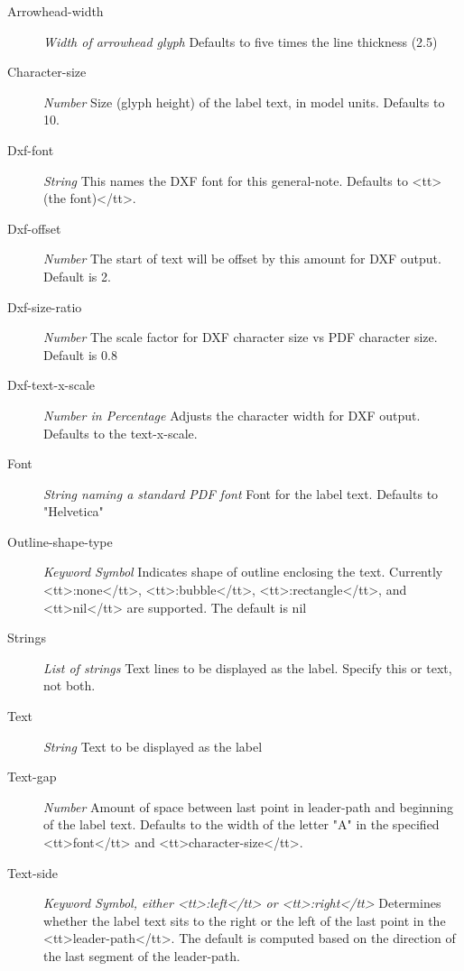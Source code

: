 \documentclass [11pt]{book}
\begin{document}
\begin{itemize}
\begin{description}
\item [Arrowhead-width]
\emph{Width of arrowhead glyph} Defaults to five times the line thickness (2.5)


\item [Character-size]
\emph{Number} Size (glyph height) of the label text, in model units. Defaults to 10.


\item [Dxf-font]
\emph{String} This names the DXF font for this general-note. Defaults to <tt>(the font)</tt>.


\item [Dxf-offset]
\emph{Number} The start of text will be offset by this amount for DXF output. Default is 2.


\item [Dxf-size-ratio]
\emph{Number} The scale factor for DXF character size vs PDF character size. Default is 0.8


\item [Dxf-text-x-scale]
\emph{Number in Percentage} Adjusts the character width for DXF output. Defaults to the text-x-scale.


\item [Font]
\emph{String naming a standard PDF font} Font for the label text. Defaults to "Helvetica"


\item [Outline-shape-type]
\emph{Keyword Symbol} Indicates shape of outline enclosing the text. Currently <tt>:none</tt>, <tt>:bubble</tt>, <tt>:rectangle</tt>,
and <tt>nil</tt> are supported. The default is nil


\item [Strings]
\emph{List of strings} Text lines to be displayed as the label. Specify this or text, not both.


\item [Text]
\emph{String} Text to be displayed as the label


\item [Text-gap]
\emph{Number} Amount of space between last point in leader-path and beginning of the label text. Defaults to the
width of the letter "A" in the specified <tt>font</tt> and <tt>character-size</tt>.


\item [Text-side]
\emph{Keyword Symbol, either <tt>:left</tt> or <tt>:right</tt>} Determines whether the label text sits to
the right or the left of the last point in the <tt>leader-path</tt>. The default is computed based on
the direction of the last segment of the leader-path.



\end{description}
\end{itemize}
\end{document}
